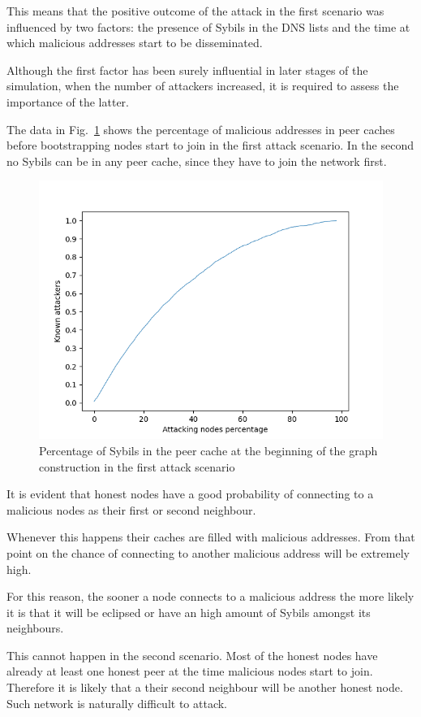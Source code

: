 This means that the positive outcome of the attack in the first scenario was influenced by two factors: the presence of Sybils in the DNS lists and the time at which malicious addresses start to be disseminated.

Although the first factor has been surely influential in later stages of the simulation, when the number of attackers increased, it is required to assess the importance of the latter.

The data in Fig.~\ref{fig:beginning} shows the percentage of malicious addresses in peer caches before bootstrapping nodes start to join in the first attack scenario. In the second no Sybils can be in any peer cache, since they have to join the network first.\par

\begin{figure}[h!]
	\includegraphics[width=.7\textwidth]{pict/results/in-atkknown-beginning.png}
	\centering
	\caption{Percentage of Sybils in the peer cache at the beginning of the graph construction in the first attack scenario}
	\label{fig:beginning}
\end{figure}

It is evident that honest nodes have a good probability of connecting to a malicious nodes as their first or second neighbour.

Whenever this happens their caches are filled with malicious addresses. From that point on the chance of connecting to another malicious address will be extremely high.

For this reason, the sooner a node connects to a malicious address the more likely it is that it will be eclipsed or have an high amount of Sybils amongst its neighbours.

This cannot happen in the second scenario. Most of the honest nodes have already at least one honest peer at the time malicious nodes start to join. Therefore it is likely that a their second neighbour will be another honest node. Such network is naturally difficult to attack.

